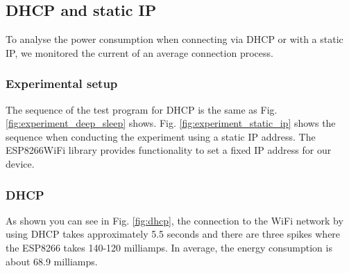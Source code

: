 \subsection{DHCP and static IP}
To analyse the power consumption when connecting via DHCP or with a static IP, we monitored the current of an average connection process.\\

\subsubsection{Experimental setup}
The sequence of the test program for DHCP is the same as Fig. \ref{fig:experiment_deep_sleep} shows.
Fig. \ref{fig:experiment_static_ip} shows the sequence when conducting the experiment using a static IP address.
The ESP8266WiFi library provides functionality to set a fixed IP address for our device.\\

\subsubsection{DHCP}
As shown you can see in Fig. \ref{fig:dhcp}, the connection to the WiFi network by using DHCP takes approximately 5.5 seconds and there are three spikes where the ESP8266 takes 140-120 milliamps.
In average, the energy consumption is about 68.9 milliamps.

